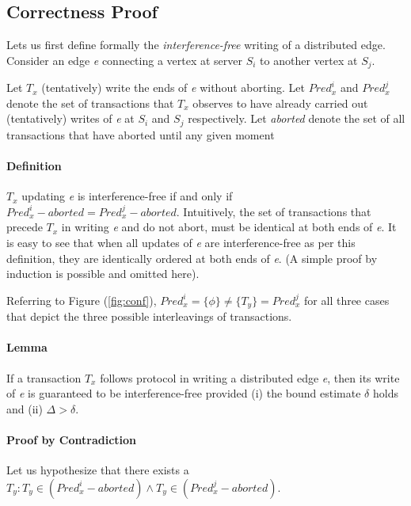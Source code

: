 \let\oldref\ref
\renewcommand{\ref}[1]{(\oldref{#1})}

\subsection{Correctness Proof}
\label{sec:correctness-proof}

Lets us first define formally the \emph{interference-free} writing of a distributed edge.
Consider an edge \emph{e} connecting a vertex at server $S_i$ to another vertex at $S_j$.

Let $T_x$ (tentatively) write the ends of \emph{e} without aborting.
Let $Pred_{x}^{i}$ and $Pred_{x}^{j}$ denote the set of transactions that $T_x$ observes to have already carried out (tentatively) writes of \emph{e} at $S_i$ and $S_j$ respectively.
Let \emph{aborted} denote the set of all transactions that have aborted until any given moment

\paragraph{Definition}
$T_x$ updating \emph{e} is interference-free if and only if  $Pred_{x}^{i}-aborted =  Pred_{x}^{j}-aborted$.
Intuitively, the set of transactions that precede $T_x$ in writing \emph{e} and do not abort, must be identical at both ends of \emph{e}.
It is easy to see that when all updates of \emph{e} are interference-free as per this definition, they are identically ordered at both ends of \emph{e}.
(A simple proof by induction is possible and omitted here).

Referring to Figure \ref{fig:conf}, $Pred_{x}^{i} = \{ \phi \} \neq \{ T_y\} =  Pred_{x}^{j}$ for all three cases that depict the three possible interleavings of transactions.

\paragraph{Lemma}
If a transaction $T_x$ follows \tDelta protocol in writing a distributed edge \emph{e}, then its write of \emph{e} is guaranteed to be interference-free provided (i) the bound estimate $\delta$ holds and (ii) $\Delta > \delta$.

\paragraph{Proof by Contradiction}
Let us hypothesize that there exists a $T_y : T_y \in (Pred_{x}^{i}-aborted) \land T_y \in (Pred_{x}^{j}-aborted)$.

